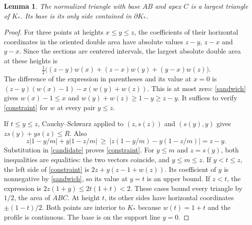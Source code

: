 \documentclass[11pt]{article}
\newtheorem{lemma}[theorem]{Lemma}
\begin{document}
\begin{lemma}\label{admissible}
The normalized triangle with base $AB$ and apex $C$ is a largest triangle
of $K_*$. Its base is its only side contained in $\partial K_*$.
\end{lemma}
\begin{proof}
For three points at heights $x\le y\le z$, the coefficients of their
horizontal coordinates in the oriented double area have absolute values
$z-y$, $z-x$ and $y-x$. Since the sections are centered intervals,
the largest absolute double area at these heights is
\[
 \tfrac12\big((z-y)w(x)+(z-x)w(y)+(y-x)w(z)\big).
\]
The difference of the expression in parentheses and its value at $x=0$ is
$(z-y)(w(x)-1)-x(w(y)+w(z))$. This is at most zero:
\eqref{sandwich} gives $w(x)-1\le x$ and
$w(y)+w(z)\ge1-y\ge z-y$. It suffices to verify
\eqref{constraint} for $w$ at every pair $y\le z$.

If $t\le y\le z$, Cauchy--Schwarz applied to
$(z,s(z))$ and $(s(y),y)$ gives $zs(y)+ys(z)\le R$. Also
\[
 z\lvert1-y/m\rvert+y\lvert1-z/m\rvert
 \ \ge\ \lvert z(1-y/m)-y(1-z/m)\rvert=z-y.
\]
Substitution in \eqref{candidate} proves \eqref{constraint}.
For $y\le m$ and $z=s(y)$, both inequalities are equalities:
the two vectors coincide, and $y\le m\le z$.
If $y<t\le z$, the left side of \eqref{constraint} is
$2z+y(z-1+w(z))$. Its coefficient of $y$ is nonnegative by
\eqref{sandwich}, so its value at $y=t$ is an upper bound.
If $z<t$, the expression is $2z(1+y)\le2t(1+t)<2$.
These cases bound every triangle by $1/2$, the area of $ABC$.
At height $t$, its other sides have horizontal coordinates
$\pm(1-t)/2$. Both points are interior to $K_*$ because
$w(t)=1+t$ and the profile is continuous. The base is on the
support line $y=0$.
\end{proof}
\end{document}
